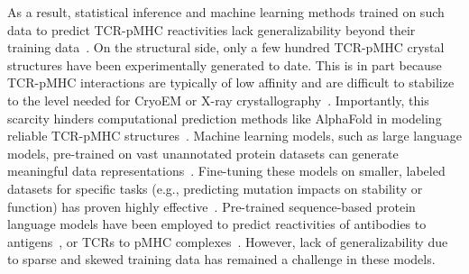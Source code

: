 As a result, statistical inference and machine learning methods trained on such data to predict
TCR-pMHC reactivities lack generalizability beyond their training
data~\cite{Isacchini2021-fs,Weber2021-ik,Meynard-Piganeau2024-po}. On the structural side, only a
few hundred TCR-pMHC crystal structures have been experimentally generated to date. This is in part
because TCR-pMHC interactions are typically of low affinity and are difficult to stabilize to the
level needed for CryoEM or X-ray crystallography~\cite{Piepenbrink2009-jy}. Importantly, this
scarcity hinders computational prediction methods like AlphaFold in modeling reliable TCR-pMHC
structures~\cite{Bradley2023-rl,Yin2023-zm}. Machine learning models, such as large language models,
pre-trained on vast unannotated protein datasets can generate meaningful data
representations~\cite{Rives2021-sr,Lin2023-ub}. Fine-tuning these models on smaller, labeled
datasets for specific tasks (e.g., predicting mutation impacts on stability or function) has proven
highly effective~\cite{Madani2023-mg,Schmirler2024-wp,Wang2024-ep,Hie2024-vb}. Pre-trained
sequence-based protein language models have been employed to predict reactivities of antibodies to
antigens~\cite{Wang2024-ep,Hie2024-vb}, or TCRs to pMHC
complexes~\cite{Bravi2023-aj,Meynard-Piganeau2024-po}. However, lack of generalizability due to
sparse and skewed training data has remained a challenge in these models.

